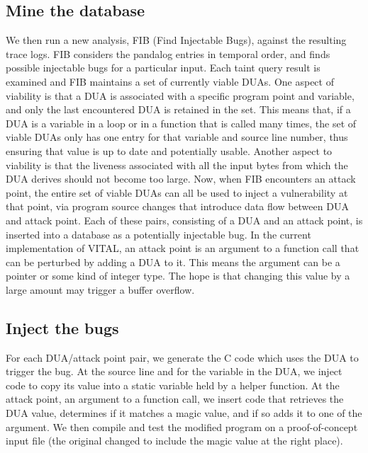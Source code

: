 \subsection{Mine the database}
\label{sec:mining}
We then run a new analysis, FIB (Find Injectable Bugs), against the resulting trace logs.
FIB considers the pandalog entries in temporal order, and finds possible injectable bugs for a particular input.
Each taint query result is examined and FIB maintains a set of currently viable DUAs.
One aspect of viability is that a DUA is associated with a specific program point and variable, and only the last encountered DUA is retained in the set. 
This means that, if a DUA is a variable in a loop or in a function that is called many times, the set of viable DUAs only has one
entry for that variable and source line number, thus ensuring that value is up to date and potentially usable.  
Another aspect to viability is that the liveness associated with all the input bytes from which the DUA derives should not become too large.
Now, when FIB encounters an attack point, the entire set of viable DUAs can all be used to inject a vulnerability at that point, via program source changes that introduce data flow between DUA and attack point. 
Each of these pairs, consisting of a DUA and an attack point, is inserted into a database as a potentially injectable bug.  
In the current implementation of VITAL, an attack point is an argument to a function call that can be perturbed by adding a DUA to it. 
This means the argument can be a pointer or some kind of integer type. 
The hope is that changing this value by a large amount may trigger a buffer overflow. 

\subsection{Inject the bugs}
For each DUA/attack point pair, we generate the C code which uses the DUA to trigger the bug.
At the source line and for the variable in the DUA, we inject code to copy its value into a static variable held by a helper function.
At the attack point, an argument to a function call, we insert code that retrieves the DUA value, determines if it matches a magic value, and if so adds it to one of the argument.
We then compile and test the modified program on a proof-of-concept input file (the original changed to include the magic value at the right place).
